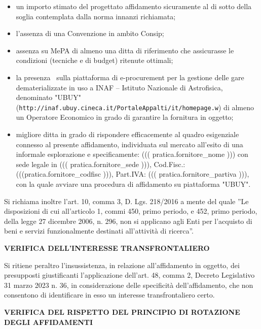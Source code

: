 \documentclass[a4paper,12pt]{letter}
\begin{document}
\begin{itemize}

\item un importo stimato del progettato affidamento sicuramente al di
sotto della soglia contemplata dalla norma innanzi richiamata;

\item l’assenza di una Convenzione in ambito Consip;

\item assenza su MePA di almeno una ditta di riferimento che assicurasse
le condizioni (tecniche e di budget) ritenute ottimali;

\item la presenza  sulla piattaforma di e-procurement
per la gestione delle gare dematerializzate in uso a INAF
– Istituto Nazionale di Astrofisica, denominato "UBUY"
(\texttt{http://inaf.ubuy.cineca.it/PortaleAppalti/it/homepage.w}) di almeno un
Operatore Economico in grado di garantire la fornitura in oggetto;

\item migliore ditta in grado di rispondere efficacemente al quadro esigenziale
connesso al presente affidamento, individuata sul mercato all’esito di
una informale esplorazione e specificamente:
((( pratica.fornitore_nome ))) con sede legale in ((( pratica.fornitore_sede ))),
Cod.Fisc.: (((pratica.fornitore_codfisc ))), Part.IVA: ((( pratica.fornitore_partiva ))),
con la quale avviare una procedura di affidamento su piattaforma "UBUY".

\end{itemize}

Si richiama inoltre l’art. 10, comma 3, D. Lgs. 218/2016 a mente
del quale ''Le disposizioni di cui all'articolo 1, commi 450, primo
periodo, e 452, primo periodo, della legge 27 dicembre 2006, n. 296, non
si applicano agli Enti per l'acquisto di beni e servizi funzionalmente
destinati all'attività di ricerca''.



\textbf{VERIFICA DELL’INTERESSE TRANSFRONTALIERO}

Si ritiene peraltro l’insussistenza, in relazione all’affidamento in
oggetto, dei presupposti giustificanti l’applicazione dell’art. 48,
comma 2, Decreto Legislativo 31 marzo 2023 n. 36, in considerazione delle
specificità dell’affidamento, che non consentono di identificare in
esso un interesse transfrontaliero certo. 

\textbf{VERIFICA DEL RISPETTO DEL PRINCIPIO DI ROTAZIONE DEGLI AFFIDAMENTI}
\end{document}

